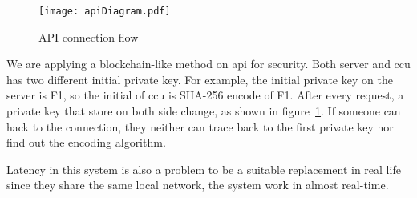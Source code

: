 \begin{figure}[H]
    \centering
    \texttt{[image: apiDiagram.pdf]}
    \caption{API connection flow}
    \label{fig:apiDiag}
\end{figure}

We are applying a blockchain-like method on \acrshort{api} for security. Both server and \acrshort{ccu} has two different initial private key. For example, the initial private key on the server is F1, so the initial of \acrshort{ccu} is SHA-256 encode of F1. After every request, a private key that store on both side change, as shown in figure~\ref{fig:apiDiag}. If someone can hack to the connection, they neither can trace back to the first private key nor find out the encoding algorithm.

Latency in this system is also a problem to be a suitable replacement in real life since they share the same local network, the system work in almost real-time.


